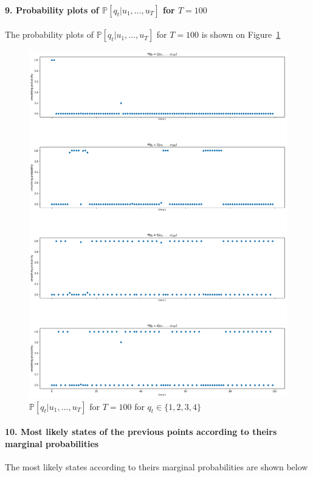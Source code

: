 \documentclass[11pt]{article}
\numberwithin{figure}{section} %
\begin{document}
\paragraph{9. Probability plots of $\mathbb{P}[q_t | u_1, \hdots, u_{T}]$ for $T =100$}
The probability plots of $\mathbb{P}[q_t | u_1, \hdots, u_{T}]$ for $T =100$ is shown on Figure~\ref{fig:prob_test}
\begin{figure}[H]
\centering
\includegraphics[width=1\linewidth]{images/q9}
\caption{$\mathbb{P}[q_t | u_1, \hdots, u_{T}]$ for $T =100$ for $q_t \in \{1,2,3,4\}$}
\label{fig:prob_test}
\end{figure}

\paragraph{10. Most likely states of the previous points according to theirs marginal probabilities}
The most likely states according to theirs marginal probabilities are shown below
\end{document}
